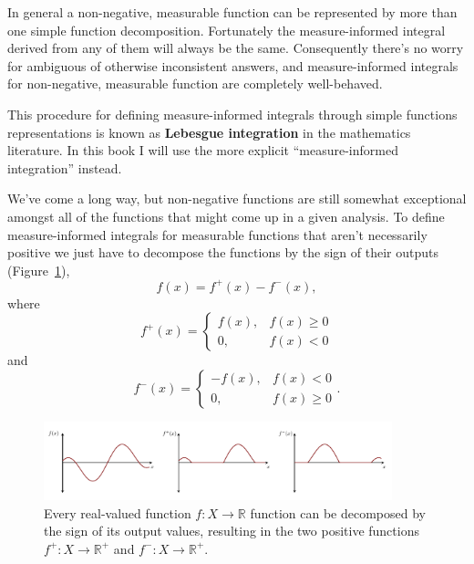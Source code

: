 \documentclass[
  letterpaper,
  DIV=11,
  numbers=noendperiod]{scrartcl}
\begin{document}
In general a non-negative, measurable function can be represented by
more than one simple function decomposition. Fortunately the
measure-informed integral derived from any of them will always be the
same. Consequently there's no worry for ambiguous of otherwise
inconsistent answers, and measure-informed integrals for non-negative,
measurable function are completely well-behaved.

This procedure for defining measure-informed integrals through simple
functions representations is known as \textbf{Lebesgue integration} in
the mathematics literature. In this book I will use the more explicit
``measure-informed integration'' instead.

We've come a long way, but non-negative functions are still somewhat
exceptional amongst all of the functions that might come up in a given
analysis. To define measure-informed integrals for measurable functions
that aren't necessarily positive we just have to decompose the functions
by the sign of their outputs (Figure~\ref{fig-sign-decomposition}), \[
f(x) = f^{+}(x) - f^{-}(x),
\] where \[
f^{+} (x) =
\left\{
\begin{array}{rr}
f(x), & f(x) \ge 0 \\
0, & f(x) < 0
\end{array}
\right.
\] and \[
f^{-} (x) =
\left\{
\begin{array}{rr}
- f(x), & f(x) < 0 \\
0, & f(x) \ge 0
\end{array}
\right. .
\]

\begin{figure}

{\centering \includegraphics[width=0.9\textwidth,height=\textheight]{figures/sign_decomposition/sign_decomposition.pdf}

}

\caption{\label{fig-sign-decomposition}Every real-valued function
\(f: X \rightarrow \mathbb{R}\) function can be decomposed by the sign
of its output values, resulting in the two positive functions
\(f^{+}: X \rightarrow \mathbb{R}^{+}\) and
\(f^{-}: X \rightarrow \mathbb{R}^{+}\).}

\end{figure}
\end{document}
